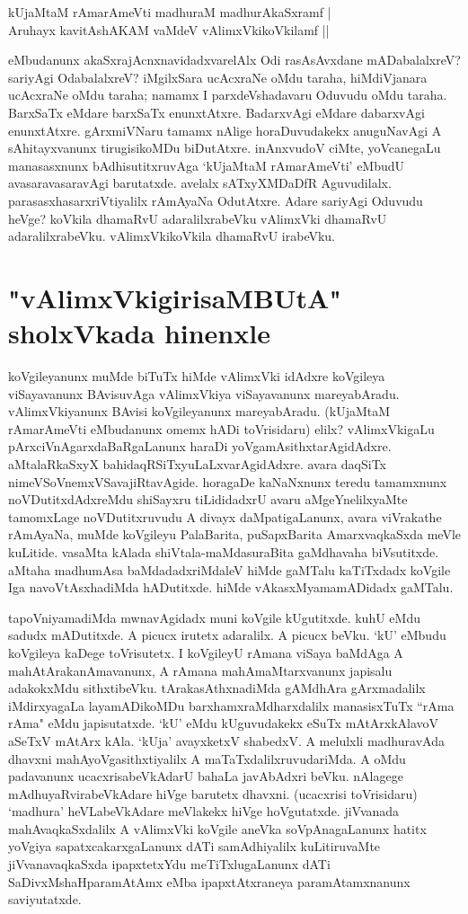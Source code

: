 \begin{shloka}
kUjaMtaM rAmarAmeVti madhuraM madhurAkaSxramf |\label{184}\\ 
Aruhayx kavitAshAKAM vaMdeV vAlimxVkikoVkilamf || 
\end{shloka} 

eMbudanunx akaSxrajAcnxnavidadxvarelAlx Odi rasAsAvxdane mADabalalxreV? sariyAgi OdabalalxreV? iMgilxSara ucAcxraNe oMdu taraha, hiMdiVjanara ucAcxraNe oMdu taraha; namamx I parxdeVshadavaru Oduvudu oMdu taraha. BarxSaTx eMdare barxSaTx enunxtAtxre. BadarxvAgi eMdare dabarxvAgi enunxtAtxre. gArxmiVNaru tamamx nAlige horaDuvudakekx anuguNavAgi A sAhitayxvanunx tirugisikoMDu biDutAtxre. inAnxvudoV ciMte, yoVcanegaLu manasasxnunx bAdhisutitxruvAga `kUjaMtaM rAmarAmeVti' eMbudU avasaravasaravAgi barutatxde. avelalx sATxyXMDaDfR Aguvudilalx. parasasxhasarxriVtiyalilx rAmAyaNa OdutAtxre. Adare sariyAgi Oduvudu heVge? koVkila dhamaRvU adaralilxrabeVku vAlimxVki dhamaRvU adaralilxrabeVku. vAlimxVkikoVkila dhamaRvU irabeVku. 

\section*{"vAlimxVkigirisaMBUtA" sholxVkada hinenxle} 

koVgileyanunx muMde biTuTx hiMde vAlimxVki idAdxre koVgileya viSayavanunx BAvisuvAga vAlimxVkiya viSayavanunx mareyabAradu. vAlimxVkiyanunx BAvisi koVgileyanunx mareyabAradu. (kUjaMtaM rAmarAmeVti eMbudanunx omemx hADi toVrisidaru) elilx? vAlimxVkigaLu pArxciVnAgarxdaBaRgaLanunx haraDi yoVgamAsithxtarAgidAdxre. aMtalaRkaSxyX bahidaqRSiTxyuLaLxvarAgidAdxre. avara daqSiTx nimeVSoVnemxVSavajiRtavAgide. horagaDe kaNaNxnunx teredu tamamxnunx noVDutitxdAdxreMdu shiSayxru tiLididadxrU avaru aMgeYnelilxyaMte tamomxLage noVDutitxruvudu A divayx daMpatigaLanunx, avara viVrakathe rAmAyaNa, muMde koVgileyu PalaBarita, puSapxBarita AmarxvaqkaSxda meVle kuLitide. vasaMta kAlada shiVtala-maMdasuraBita gaMdhavaha biVsutitxde. aMtaha madhumAsa baMdadadxriMdaleV hiMde gaMTalu kaTiTxdadx koVgile Iga navoVtAsxhadiMda hADutitxde. hiMde vAkasxMyamamADidadx gaMTalu. 

tapoVniyamadiMda mwnavAgidadx muni koVgile kUgutitxde. kuhU eMdu sadudx mADutitxde. A picucx irutetx adaralilx. A picucx beVku. `kU' eMbudu koVgileya kaDege toVrisutetx. I koVgileyU rAmana viSaya baMdAga A mahAtArakanAmavanunx, A rAmana mahAmaMtarxvanunx japisalu adakokxMdu sithxtibeVku. tArakasAthxnadiMda gAMdhAra gArxmadalilx iMdirxyagaLa layamADikoMDu barxhamxraMdharxdalilx manasisxTuTx ``rAma rAma" eMdu japisutatxde. `kU' eMdu kUguvudakekx eSuTx mAtArxkAlavoV aSeTxV mAtArx kAla. `kUja' avayxketxV shabedxV. A melulxli madhuravAda dhavxni mahAyoVgasithxtiyalilx A maTaTxdalilxruvudariMda. A oMdu padavanunx ucacxrisabeVkAdarU bahaLa javAbAdxri beVku. nAlagege mAdhuyaRvirabeVkAdare hiVge barutetx dhavxni. (ucacxrisi toVrisidaru) `madhura' heVLabeVkAdare meVlakekx hiVge hoVgutatxde. jiVvanada mahAvaqkaSxdalilx A vAlimxVki koVgile aneVka soVpAnagaLanunx hatitx yoVgiya sapatxcakarxgaLanunx dATi samAdhiyalilx kuLitiruvaMte jiVvanavaqkaSxda ipapxtetxYdu meTiTxlugaLanunx dATi SaDivxMshaHparamAtAmx\label{185} eMba ipapxtAtxraneya paramAtamxnanunx saviyutatxde. 


